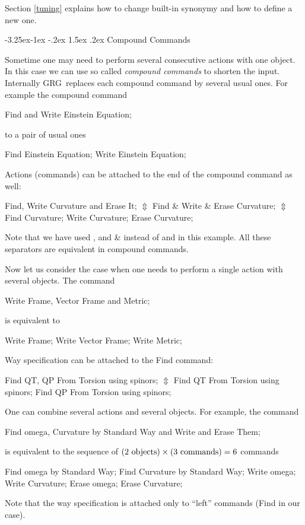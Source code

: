 \documentclass[twoside,openright]{report}
\makeatletter
\newcommand{\grgtt}{\ttfamily}
\renewcommand{\tt}{\grgtt}
\newcommand{\udr}{\mbox{$\Updownarrow$}}
\newcommand{\grg}{{\sc GRG}}
\renewcommand\subsection{\@startsection{subsection}{2}{\z@}%
                                     {-3.25ex\@plus -1ex \@minus -.2ex}%
                                     {1.5ex \@plus .2ex}%
                                     {\normalfont\large\slshape\bfseries}}
\makeatother
\begin{document}
Section \ref{tuning} explains how to change built-in synonymy
and how to define a new one.


\subsection{Compound Commands}

Sometime one may need to perform several consecutive actions
with one object. In this case we can use so called
\emph{compound commands} to shorten the input.
Internally \grg\ replaces each compound command by several usual
ones. For example the compound command
\begin{listing}
   Find and Write Einstein Equation;
\end{listing}
to a pair of usual ones
\begin{listing}
   Find Einstein Equation;
   Write Einstein Equation;
\end{listing}
Actions (commands) can be attached to the end of the
compound command as well:
\begin{listing}
   Find, Write Curvature and Erase It;
\qquad\qquad \udr
   Find \& Write \& Erase Curvature;
\qquad\qquad \udr
   Find Curvature;
   Write Curvature;
   Erase Curvature;
\end{listing}
Note that we have used {\tt ,} and {\tt \&} instead of {\tt and}
in this example. All these separators are equivalent in compound
commands.

Now let us consider the case when one needs to perform a single action
with several objects. The command
\begin{listing}
   Write Frame, Vector Frame and Metric;
\end{listing}
is equivalent to
\begin{listing}
   Write Frame;
   Write Vector Frame;
   Write Metric;
\end{listing}
Way specification can be attached to the {\tt Find} command:
\begin{listing}
   Find QT, QP From Torsion using spinors;
\qquad\qquad \udr
   Find QT From Torsion using spinors;
   Find QP From Torsion using spinors;
\end{listing}
One can combine several actions and several objects.
For example, the command
\begin{listing}
   Find omega, Curvature by Standard Way and Write and Erase Them;
\end{listing}
is equivalent to the sequence of
$(2{\rm\ objects})\times(3{\rm\ commands}) =6$
commands
\begin{listing}
   Find omega by Standard Way;
   Find Curvature by Standard Way;
   Write omega;
   Write Curvature;
   Erase omega;
   Erase Curvature;
\end{listing}
Note that the way specification is attached only to ``left''
commands ({\tt Find} in our case).
\end{document}
